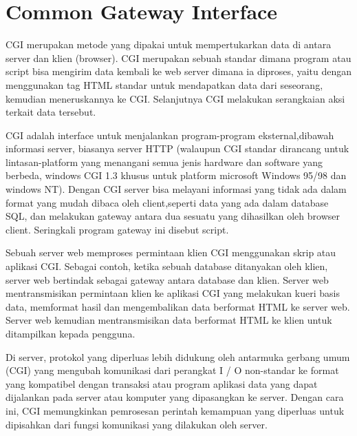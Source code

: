 


\section{Common Gateway Interface}
CGI merupakan metode yang dipakai untuk mempertukarkan data di antara server dan klien (browser). CGI merupakan sebuah standar dimana program atau script bisa mengirim data kembali ke web server dimana ia diproses, yaitu dengan menggunakan tag HTML standar untuk mendapatkan data dari seseorang, kemudian meneruskannya ke CGI. Selanjutnya CGI melakukan serangkaian aksi terkait data tersebut\cite{prihatmoko2013pengembangan}.



\par CGI adalah interface untuk menjalankan program-program eksternal,dibawah informasi server, biasanya server HTTP (walaupun CGI standar dirancang untuk lintasan-platform yang
menangani semua jenis hardware dan software yang berbeda, windows CGI 1.3 khusus untuk platform microsoft Windows 95/98 dan windows NT). Dengan CGI server bisa
melayani informasi yang tidak ada dalam format yang mudah dibaca oleh client,seperti data yang ada dalam database SQL, dan melakukan gateway antara dua sesuatu yang 
dihasilkan oleh browser client. Seringkali program gateway ini disebut script.

\par Sebuah server web memproses permintaan klien CGI menggunakan skrip atau aplikasi CGI. Sebagai contoh, ketika sebuah database ditanyakan oleh klien, 
server web bertindak sebagai gateway antara database dan klien. Server web mentransmisikan permintaan klien ke aplikasi CGI yang melakukan kueri basis data,
 memformat hasil dan mengembalikan data berformat HTML ke server web. Server web kemudian mentransmisikan data berformat HTML ke klien untuk ditampilkan kepada pengguna.

\par Di server, protokol yang diperluas lebih didukung oleh antarmuka gerbang umum (CGI) yang mengubah komunikasi dari perangkat I / O non-standar ke format yang kompatibel 
dengan transaksi atau program aplikasi data yang dapat dijalankan pada server atau komputer yang dipasangkan ke server. 
Dengan cara ini, CGI memungkinkan pemrosesan perintah kemampuan yang diperluas untuk dipisahkan dari fungsi komunikasi yang dilakukan oleh server.




